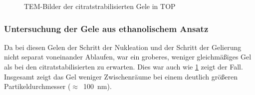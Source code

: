 		\begin{figure}[htbp]
			\centering
			\caption{TEM-Bilder der citratstrabilisierten Gele in TOP}
			\label{fig:Gel-C}
		\end{figure}
		
	\subsubsection{Untersuchung der Gele aus ethanolischem Ansatz}
		
		Da bei diesen Gelen der Schritt der Nukleation und der Schritt der Gelierung nicht separat voneinander Ablaufen, war ein groberes, weniger gleichmäßiges Gel als bei den citratstabilisierten zu erwarten.
		Dies war auch wie \cref{fig:Gel-C} zeigt der Fall.
		Insgesamt zeigt das Gel weniger Zwischenräume bei einem deutlich größeren Partikeldurchmesser ($\approx$~\SI{100}{\nano\meter}).
		
